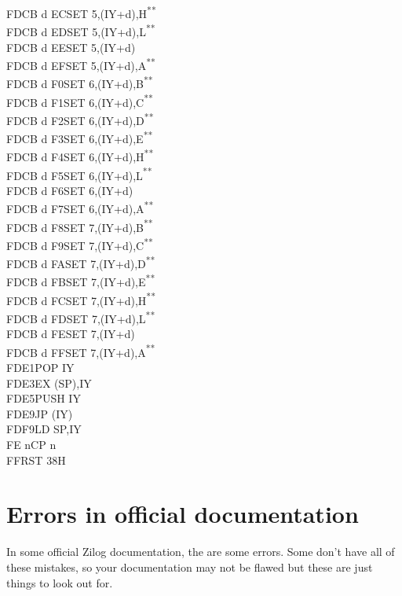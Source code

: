 \documentclass[12pt,twoside,openright,a4paper]{book}
\newcommand{\UNDOC}{\textnormal{\textsuperscript{**}}}
\begin{document}
\begin{multicols}{3}
{\begin{tabbing}
	FDCB d EC\>SET 5,(IY+d),H\UNDOC\\
	FDCB d ED\>SET 5,(IY+d),L\UNDOC\\
	FDCB d EE\>SET 5,(IY+d)\\
	FDCB d EF\>SET 5,(IY+d),A\UNDOC\\
	FDCB d F0\>SET 6,(IY+d),B\UNDOC\\
	FDCB d F1\>SET 6,(IY+d),C\UNDOC\\
	FDCB d F2\>SET 6,(IY+d),D\UNDOC\\
	FDCB d F3\>SET 6,(IY+d),E\UNDOC\\
	FDCB d F4\>SET 6,(IY+d),H\UNDOC\\
	FDCB d F5\>SET 6,(IY+d),L\UNDOC\\
	FDCB d F6\>SET 6,(IY+d)\\
	FDCB d F7\>SET 6,(IY+d),A\UNDOC\\
	FDCB d F8\>SET 7,(IY+d),B\UNDOC\\
	FDCB d F9\>SET 7,(IY+d),C\UNDOC\\
	FDCB d FA\>SET 7,(IY+d),D\UNDOC\\
	FDCB d FB\>SET 7,(IY+d),E\UNDOC\\
	FDCB d FC\>SET 7,(IY+d),H\UNDOC\\
	FDCB d FD\>SET 7,(IY+d),L\UNDOC\\
	FDCB d FE\>SET 7,(IY+d)\\
	FDCB d FF\>SET 7,(IY+d),A\UNDOC\\
	FDE1\>POP IY\\
	FDE3\>EX (SP),IY\\
	FDE5\>PUSH IY\\
	FDE9\>JP (IY)\\
	FDF9\>LD SP,IY\\
	FE n\>CP n\\
	FF\>RST 38H
\end{tabbing}
}
\end{multicols}
\normalsize



\chapter{Errors in official documentation}


In some official Zilog documentation, the are some errors. Some don't have all of these mistakes, so your documentation may not be flawed but these are just things to look out for.
\end{document}
